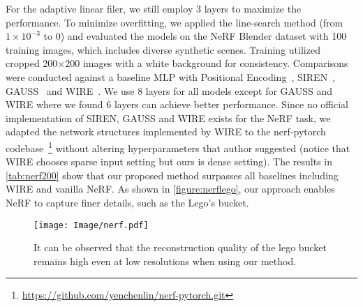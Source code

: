 For the adaptive linear filer, we still employ 3 layers to maximize the performance. To minimize overfitting, we applied the line-search method (from $1 \times 10^{-3}$ to 0) and evaluated the models on the NeRF Blender dataset \citep{martin2021nerf} with 100 training images, which includes diverse synthetic scenes. Training utilized cropped 200$\times$200 images with a white background for consistency. Comparisons were conducted against a baseline MLP with Positional Encoding~\citep{mildenhall2021nerf}, SIREN~\citep{sitzmann2020implicit}, GAUSS~\citep{ramasinghe2022beyond} and WIRE~\citep{saragadam2023wire}. We use 8 layers for all models except for GAUSS and WIRE where we found 6 layers can achieve better performance. Since no official implementation of SIREN, GAUSS and WIRE exists for the NeRF task, we adapted the network structures implemented by WIRE to the nerf-pytorch codebase~\footnote{\url{https://github.com/yenchenlin/nerf-pytorch.git}} without altering hyperparameters that author suggested (notice that WIRE chooses sparse input setting but ours is dense setting).
The results in \autoref{tab:nerf200} show that our proposed method surpasses all baselines including WIRE and vanilla NeRF. As shown in \autoref{figure:nerflego}, our approach enables NeRF to capture finer details, such as the Lego's bucket.
\begin{figure}[!ht]
    \centering
    \texttt{[image: Image/nerf.pdf]}
    \caption{It can be observed that the reconstruction quality of the lego bucket remains high even at low resolutions when using our method.}
    \vspace{-15pt} 
    \label{figure:nerflego}
\end{figure}



